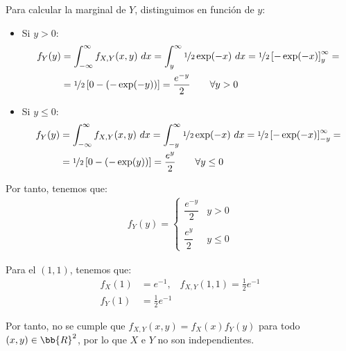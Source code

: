 \begin{ejercicio}
    Para calcular la marginal de $Y$, distinguimos en función de $y$:
    \begin{itemize}
        \item Si $y>0$:
        \begin{align*}
            f_Y(y) &= \int_{-\infty}^{\infty} f_{X,Y}(x, y) \ dx
            = \int_{y}^{\infty} \nicefrac{1}{2}\exp(-x) \ dx
            = \nicefrac{1}{2}\left[-\exp(-x)\right]_{y}^{\infty}
            =\\&= \nicefrac{1}{2}\left[0 - (-\exp(-y))\right]
            = \frac{e^{-y}}{2} \qquad \forall y>0
        \end{align*}

        \item Si $y\leq 0$:
        \begin{align*}
            f_Y(y) &= \int_{-\infty}^{\infty} f_{X,Y}(x, y) \ dx
            = \int_{-y}^{\infty} \nicefrac{1}{2}\exp(-x) \ dx
            = \nicefrac{1}{2}\left[-\exp(-x)\right]_{-y}^{\infty}
            =\\&= \nicefrac{1}{2}\left[0 - (-\exp(y))\right]
            = \frac{e^{y}}{2} \qquad \forall y\leq 0
        \end{align*}
    \end{itemize}

    Por tanto, tenemos que:
    \begin{align*}
        f_Y(y)=\begin{cases}
            \dfrac{e^{-y}}{2} & y>0\\ \\
            \dfrac{e^{y}}{2} & y\leq 0
        \end{cases}
    \end{align*}

    Para el $(1,1)$, tenemos que:
    \begin{align*}
        f_X(1) &= e^{-1}, & f_{X,Y}(1,1)=\frac{1}{2}e^{-1} \\
        f_Y(1) &= \frac{1}{2}e^{-1} 
    \end{align*}

    Por tanto, no se cumple que $f_{X,Y}(x,y)=f_X(x)f_Y(y)$ para todo $(x,y)\in\bb{R}^2$, por lo que $X$ e $Y$ no son independientes.
\end{ejercicio}

